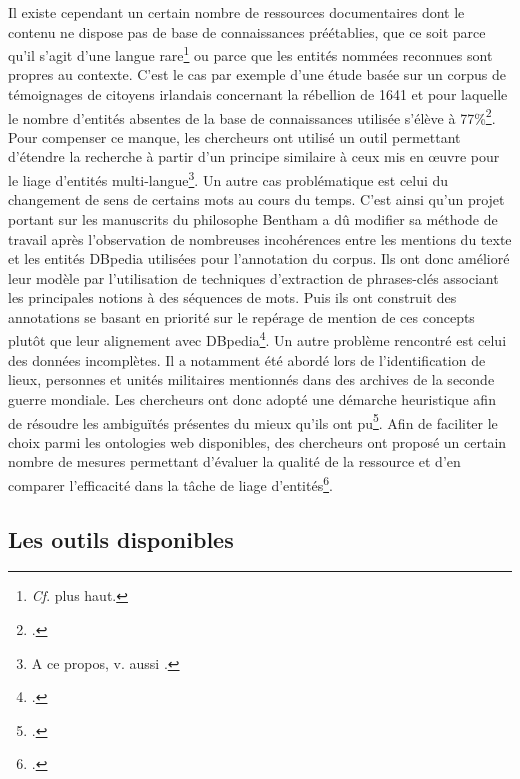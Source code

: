 \documentclass[a4paper,12pt,twoside]{book}
\begin{document}
	Il existe cependant un certain nombre de ressources documentaires dont le contenu ne dispose pas de base de connaissances préétablies, que ce soit parce qu'il s'agit d'une langue rare\footnote{\textit{Cf}. plus haut.} ou parce que les entités nommées reconnues sont propres au contexte. C'est le cas par exemple d'une étude basée sur un corpus de témoignages de citoyens irlandais concernant la rébellion de 1641 et pour laquelle le nombre d'entités absentes de la base de connaissances utilisée s'élève à 77\%\footcite{munnelly_investigating_2018}. Pour compenser ce manque, les chercheurs ont utilisé un outil permettant d'étendre la recherche à partir d'un principe similaire à ceux mis en œuvre pour le liage d'entités multi-langue\footnote{A ce propos, v. aussi \cite{mika_agdistis_2014}.}. Un autre cas problématique est celui du changement de sens de certains mots au cours du temps. C'est ainsi qu'un projet portant sur les manuscrits du philosophe Bentham a dû modifier sa méthode de travail après l'observation de nombreuses incohérences entre les mentions du texte et les entités DBpedia utilisées pour l'annotation du corpus. Ils ont donc amélioré leur modèle par l'utilisation de techniques d'extraction de phrases-clés associant les principales notions à des séquences de mots. Puis ils ont construit des annotations se basant en priorité sur le repérage de mention de ces concepts plutôt que leur alignement avec DBpedia\footcite{ruiz_mapping_2019}. Un autre problème rencontré est celui des données incomplètes. Il a notamment été abordé lors de l'identification de lieux, personnes et unités militaires mentionnés dans des archives de la seconde guerre mondiale. Les chercheurs ont donc adopté une démarche heuristique afin de résoudre les ambiguïtés présentes du mieux qu'ils ont pu\footcite{heino_named_2017}. Afin de faciliter le choix parmi les ontologies web disponibles, des chercheurs ont proposé un certain nombre de mesures permettant d'évaluer la qualité de la ressource et d'en comparer l'efficacité dans la tâche de liage d'entités\footcite{abadie_evaluation_2017}.
	
	\subsection{Les outils disponibles}
	
\end{document}
